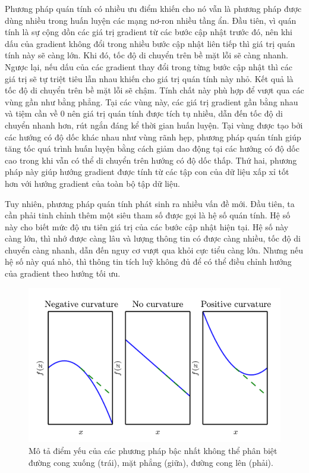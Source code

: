 Phương pháp quán tính có nhiều ưu điểm khiến cho nó vẫn là phương pháp được dùng nhiều trong huấn luyện các mạng nơ-ron nhiều tầng ẩn. Đầu tiên, vì quán tính là sự cộng dồn các giá trị gradient từ các bước cập nhật trước đó, nên khi dấu của gradient không đổi trong nhiều bước cập nhật liên tiếp thì giá trị quán tính này sẽ càng lớn. Khi đó, tốc độ di chuyển trên bề mặt lỗi sẽ càng nhanh. Ngược lại, nếu dấu của các gradient thay đổi trong từng bước cập nhật thì các giá trị sẽ tự triệt tiêu lẫn nhau khiến cho giá trị quán tính này nhỏ. Kết quả là tốc độ di chuyển trên bề mặt lỗi sẽ chậm. Tính chất này phù hợp để vượt qua các vùng gần như bằng phẳng. Tại các vùng này, các giá trị gradient gần bằng nhau và tiệm cần về 0 nên giá trị quán tính được tích tụ nhiều, dẫn đến tốc độ di chuyển nhanh hơn, rút ngắn đáng kể thời gian huấn luyện. Tại vùng được tạo bởi các hướng có độ dốc khác nhau như vùng rãnh hẹp, phương pháp quán tính giúp tăng tốc quá trình huấn luyện bằng cách giảm dao động tại các hướng có độ dốc cao trong khi vẫn có thể di chuyển trên hướng có độ dốc thấp. Thứ hai, phương pháp này giúp hướng gradient được tính từ các tập con của dữ liệu xấp xỉ tốt hơn với hướng gradient của toàn bộ tập dữ liệu.

Tuy nhiên, phương pháp quán tính phát sinh ra nhiều vấn đề mới. Đầu tiên, ta cần phải tinh chỉnh thêm một siêu tham số được gọi là hệ số quán tính. Hệ số này cho biết mức độ ưu tiên giá trị của các bước cập nhật hiện tại. Hệ số này càng lớn, thì nhớ được càng lâu và lượng thông tin có được càng nhiều, tốc độ di chuyển càng nhanh, dẫn đến nguy cơ vượt qua khỏi cực tiểu càng lớn. Nhưng nếu hệ số này quá nhỏ, thì thông tin tích luỹ không đủ để có thể điều chỉnh hướng của gradient theo hướng tối ưu.

\begin{figure}[htp]
\centering
\includegraphics[width=120 mm]{images/hessian.png}
\caption{Mô tả điểm yếu của các phương pháp bậc nhất không thể phân biệt đường cong xuống (trái), mặt phẳng (giữa), đường cong lên (phải).\cite{goodfellow2016deeplearning}}
\label{fig:hessian}
\end{figure}

